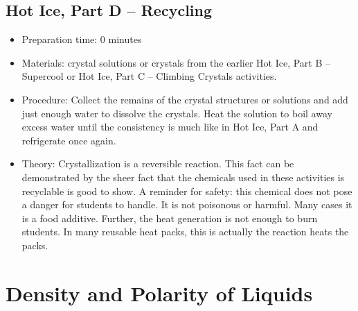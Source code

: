 \subsection{Hot Ice, Part D -- Recycling}
\begin{itemize}
\item{Preparation time: 0 minutes}
\item{Materials: crystal solutions or crystals from the earlier Hot Ice, Part B -- Supercool or Hot Ice, Part C -- Climbing Crystals activities.}
\item{Procedure: Collect the remains of the crystal structures or solutions and add just enough water to dissolve the crystals. Heat the solution to boil away excess water until the consistency is much like in Hot Ice, Part A and refrigerate once again.}
\item{Theory: Crystallization is a reversible reaction. This fact can be demonstrated by the sheer fact that the chemicals used in these activities is recyclable is good to show. A reminder for safety: this chemical does not pose a danger for students to handle. It is not poisonous or harmful. Many cases it is a food additive. Further, the heat generation is not enough to burn students. In many reusable heat packs, this is actually the reaction heats the packs.}
\end{itemize}

\section{Density and Polarity of Liquids}

